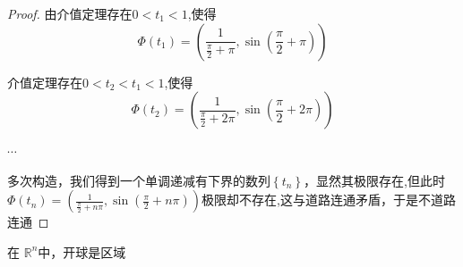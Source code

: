 \documentclass[lang=cn,10pt]{elegantbook}
\begin{document}
\begin{proof}
	由介值定理$\text{存在}0<t_1<1$,使得
	\begin{equation*}
		\Phi \left( t_1 \right) =\left( \frac{1}{\frac{\pi}{2}+\pi},\sin \left( \frac{\pi}{2}+\pi \right) \right)
	\end{equation*}
	
	介值定理$\text{存在}0<t_2<t_{1}<1$,使得
	\begin{equation*}
		\Phi \left( t_2 \right) =\left( \frac{1}{\frac{\pi}{2}+2\pi},\sin \left( \frac{\pi}{2}+2\pi \right) \right)
	\end{equation*}
	
	$\cdots$
	
	多次构造，我们得到一个单调递减有下界的数列$\left\{ t_n \right\} $，显然其极限存在,但此时$\Phi \left( t_n \right)=\left( \frac{1}{\frac{\pi}{2}+n\pi},\sin \left( \frac{\pi}{2}+n\pi \right) \right)$极限却不存在,这与道路连通矛盾，于是不道路连通
\end{proof}
\begin{example}
	在  $\mathbb{R} ^n$中，开球是区域
\end{example}
\end{document}
